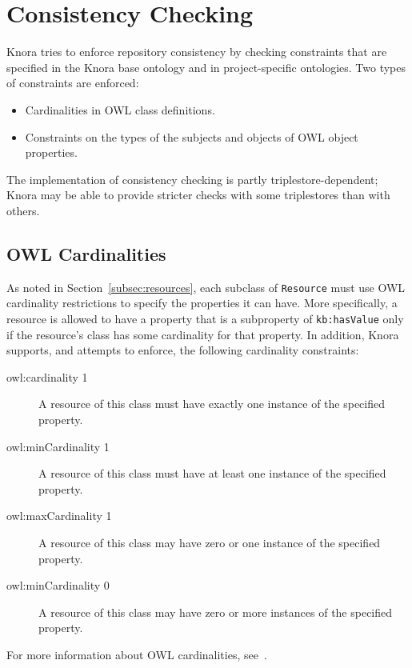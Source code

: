\documentclass[12pt, a4paper]{article}
\begin{document}
\section{Consistency Checking}

Knora tries to enforce repository consistency by checking constraints that are specified in the Knora base ontology and in project-specific ontologies. Two types of constraints are enforced:

\begin{itemize}
	\item Cardinalities in OWL class definitions.
	\item Constraints on the types of the subjects and objects of OWL object properties.
\end{itemize}

The implementation of consistency checking is partly triplestore-dependent; Knora may be able to provide stricter checks with some triplestores than with others.

\subsection{OWL Cardinalities}

\label{subsec:cardinalities}

As noted in Section~\ref{subsec:resources}, each subclass of \texttt{Resource} must use OWL cardinality restrictions to specify the properties it can have. More specifically, a resource is allowed to have a property that is a subproperty of \texttt{kb:hasValue} only if the resource's class has some cardinality for that property. In addition, Knora supports, and attempts to enforce, the following cardinality constraints:
 
\begin{description}
	\item[owl:cardinality 1] A resource of this class must have exactly one instance of the specified property.
	\item[owl:minCardinality 1] A resource of this class must have at least one instance of the specified property.
	\item[owl:maxCardinality 1] A resource of this class may have zero or one instance of the specified property.
	\item[owl:minCardinality 0] A resource of this class may have zero or more instances of the specified property.
\end{description}

For more information about OWL cardinalities, see~\cite[§2.1, Object Property Restrictions]{OWL_2_Quick_Reference_Guide}.
\end{document}
